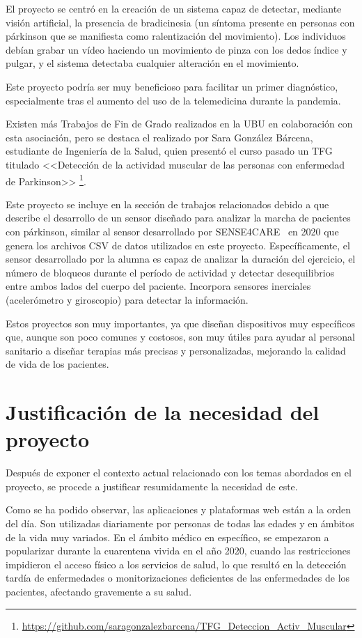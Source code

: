El proyecto se centró en la creación de un sistema capaz de detectar, mediante visión artificial, la presencia de bradicinesia (un síntoma presente en personas con párkinson que se manifiesta como ralentización del movimiento). Los individuos debían grabar un vídeo haciendo un movimiento de pinza con los dedos índice y pulgar, y el sistema detectaba cualquier alteración en el movimiento.

Este proyecto podría ser muy beneficioso para facilitar un primer diagnóstico, especialmente tras el aumento del uso de la telemedicina durante la pandemia.


Existen más Trabajos de Fin de Grado realizados en la UBU en colaboración con esta asociación, pero se destaca el realizado por Sara González Bárcena, estudiante de Ingeniería de la Salud, quien presentó el curso pasado un TFG titulado <<Detección de la actividad muscular de las personas con enfermedad de Parkinson>>
\footnote{\url{https://github.com/saragonzalezbarcena/TFG_Deteccion_Activ_Muscular}}.

Este proyecto se incluye en la sección de trabajos relacionados debido a que describe el desarrollo de un sensor diseñado para analizar la marcha de pacientes con párkinson, similar al sensor desarrollado por SENSE4CARE~\cite{sense4care} en 2020 que genera los archivos CSV de datos utilizados en este proyecto. Específicamente, el sensor desarrollado por la alumna es capaz de analizar la duración del ejercicio, el número de bloqueos durante el período de actividad y detectar desequilibrios entre ambos lados del cuerpo del paciente. Incorpora sensores inerciales (acelerómetro y giroscopio) para detectar la información.

Estos proyectos son muy importantes, ya que diseñan dispositivos muy específicos que, aunque son poco comunes y costosos, son muy útiles para ayudar al personal sanitario a diseñar terapias más precisas y personalizadas, mejorando la calidad de vida de los pacientes.



\section{Justificación de la necesidad del proyecto}
Después de exponer el contexto actual relacionado con los temas abordados en el proyecto, se procede a justificar resumidamente la necesidad de este.

Como se ha podido observar, las aplicaciones y plataformas web están a la orden del día. Son utilizadas diariamente por personas de todas las edades y en ámbitos de la vida muy variados. En el ámbito médico en específico, se empezaron a popularizar durante la cuarentena vivida en el año 2020, cuando las restricciones impidieron el acceso físico a los servicios de salud, lo que resultó en la detección tardía de enfermedades o monitorizaciones deficientes de las enfermedades de los pacientes, afectando gravemente a su salud. 

